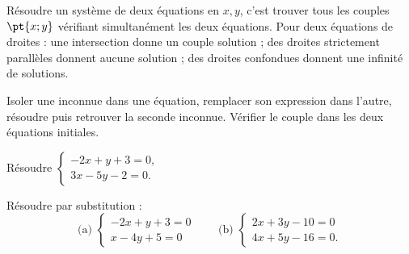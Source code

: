 \begin{keypoint}[Définition]
Résoudre un système de deux équations en $x,y$, c'est trouver tous les couples $\pt{x;y}$ vérifiant simultanément les deux équations. Pour deux équations de droites : une intersection donne un couple solution ; des droites strictement parallèles donnent aucune solution ; des droites confondues donnent une infinité de solutions.
\end{keypoint}
\begin{method}[Substitution]
Isoler une inconnue dans une équation, remplacer son expression dans l'autre, résoudre puis retrouver la seconde inconnue. Vérifier le couple dans les deux équations initiales.
\end{method}
\begin{example}Résoudre $\begin{cases}-2x+y+3=0,\\3x-5y-2=0.\end{cases}$\end{example}
\begin{example}Résoudre par substitution :
\[\text{(a) }\begin{cases}-2x+y+3=0\\x-4y+5=0\end{cases}\qquad
\text{(b) }\begin{cases}2x+3y-10=0\\4x+5y-16=0.\end{cases}\]\end{example}

